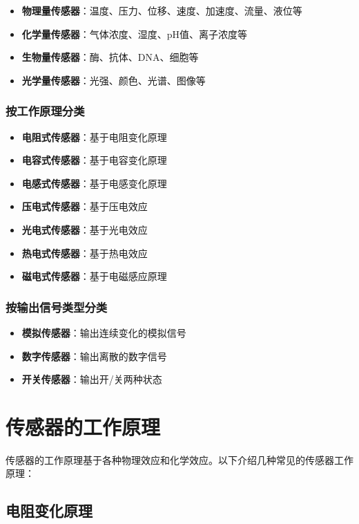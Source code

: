\documentclass[12pt,UTF8]{ctexbook}
\begin{document}
\begin{itemize}[leftmargin=2cm]
	\item \textbf{物理量传感器}：温度、压力、位移、速度、加速度、流量、液位等
	\item \textbf{化学量传感器}：气体浓度、湿度、pH值、离子浓度等
	\item \textbf{生物量传感器}：酶、抗体、DNA、细胞等
	\item \textbf{光学量传感器}：光强、颜色、光谱、图像等
\end{itemize}

\subsubsection{按工作原理分类}

\begin{itemize}[leftmargin=2cm]
	\item \textbf{电阻式传感器}：基于电阻变化原理
	\item \textbf{电容式传感器}：基于电容变化原理
	\item \textbf{电感式传感器}：基于电感变化原理
	\item \textbf{压电式传感器}：基于压电效应
	\item \textbf{光电式传感器}：基于光电效应
	\item \textbf{热电式传感器}：基于热电效应
	\item \textbf{磁电式传感器}：基于电磁感应原理
\end{itemize}

\subsubsection{按输出信号类型分类}

\begin{itemize}[leftmargin=2cm]
	\item \textbf{模拟传感器}：输出连续变化的模拟信号
	\item \textbf{数字传感器}：输出离散的数字信号
	\item \textbf{开关传感器}：输出开/关两种状态
\end{itemize}

\section{传感器的工作原理}

传感器的工作原理基于各种物理效应和化学效应。以下介绍几种常见的传感器工作原理：

\subsection{电阻变化原理}
\end{document}
